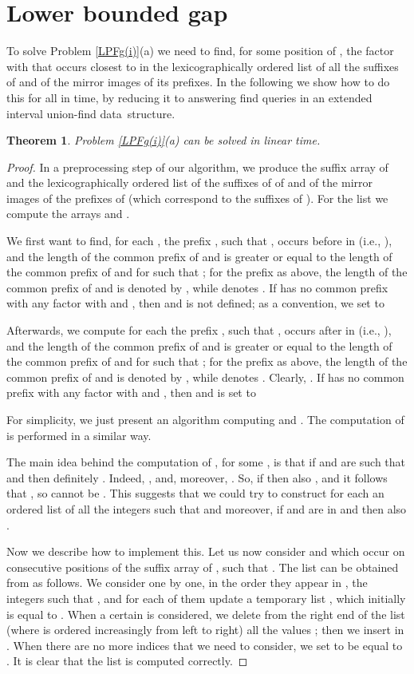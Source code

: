 \documentclass[final]{dmtcs-episciences}
\newtheorem{theorem}{Theorem}
\begin{document}
\section{Lower bounded gap}
To solve Problem \ref{LPFg(i)}(a) we need to find, for some position  of , the factor  with  that occurs closest to  in the lexicographically ordered list  of all the suffixes  of  and of the mirror images  of its prefixes. In the following we show how to do this for all  in  time, by reducing it to answering  find queries in an extended interval union-find data~structure.
\begin{theorem}\label{LPFg(i)_sol}
Problem \ref{LPFg(i)}(a) can be solved in linear time.
\end{theorem}
\begin{proof}
In a preprocessing step of our algorithm, we produce the suffix array of  and the lexicographically ordered list  of the suffixes of  of  and of the mirror images  of the prefixes of  (which correspond to the suffixes of ). For the list  we compute the arrays  and . 

We first want to find, for each , the prefix , such that ,  occurs before  in  (i.e., ), and the length of the common prefix of  and  is greater or equal to the length of the common prefix of  and  for  such that ; for the prefix  as above, the length of the common prefix of  and  is denoted by , while  denotes . If  has no common prefix with any factor  with  and , then   and  is not defined; as a convention, we set  to 

Afterwards, we compute for each  the prefix , such that ,  occurs after  in  (i.e., ), and the length of the common prefix of  and  is greater or equal to the length of the common prefix of  and  for  such that ; for the prefix  as above, the length of the common prefix of  and  is denoted by , while  denotes . Clearly, . If  has no common prefix with any factor  with  and , then   and  is set to 

For simplicity, we just present an algorithm computing  and . The computation of  is performed in a similar way.

The main idea behind the computation of , for some , is that if  and  are such that  and  then definitely . Indeed, , and, moreover, . So, if  then also , and it follows that , so  cannot be . This suggests that we could try to construct for each  an ordered list  of all the integers  such that  and moreover, if  and  are in  and  then also . 

Now we describe how to implement this. Let us now consider  and  which occur on consecutive positions of the suffix array of , such that . The list  can be obtained from  as follows. We consider one by one, in the order they appear in , the integers  such that , and for each of them update a temporary list , which initially is equal to . When a certain  is considered, we delete from the right end of the list  (where  is ordered increasingly from left to right) all the values ; then we insert  in . When there are no more indices  that we need to consider, we set  to be equal to . It is clear that the list  is computed correctly. 


\end{proof}
\end{document}
